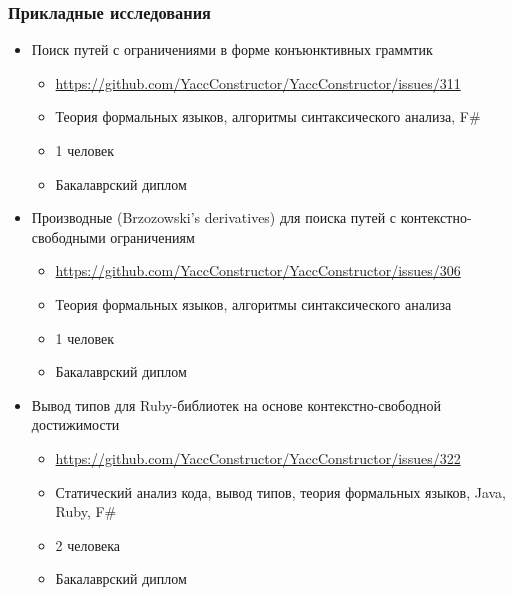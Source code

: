 \documentclass{beamer}
\begin{document}
\begin{frame}[fragile]
\transwipe[direction=90]
\frametitle{Прикладные исследования}
  \begin{itemize}
    \item Поиск путей с ограничениями в форме конъюнктивных граммтик
    \begin{itemize}
       \item \footnotesize{\url{https://github.com/YaccConstructor/YaccConstructor/issues/311}}
       \item Теория формальных языков, алгоритмы синтаксического анализа, F\#
       \item 1 человек 
       \item Бакалаврский диплом
    \end{itemize}
    \item Производные (Brzozowski’s derivatives) для поиска путей с контекстно-свободными 
    ограничениям
    \begin{itemize}
       \item \footnotesize{\url{https://github.com/YaccConstructor/YaccConstructor/issues/306}}
       \item Теория формальных языков, алгоритмы синтаксического анализа
       \item 1 человек
       \item Бакалаврский диплом
    \end{itemize}
    \item Вывод типов для Ruby-библиотек на основе контекстно-свободной достижимости
    \begin{itemize}
       \item \footnotesize{\url{https://github.com/YaccConstructor/YaccConstructor/issues/322}}
       \item Статический анализ кода, вывод типов, теория формальных языков, Java, Ruby, F\#
       \item 2 человека
       \item Бакалаврский диплом
    \end{itemize}
  \end{itemize}  
\end{frame}
\end{document}
